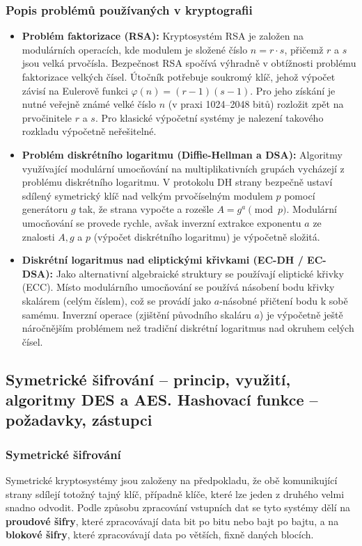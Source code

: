                 \subsubsection{Popis problémů používaných v kryptografii}
                    \begin{itemize}
                        \item \textbf{Problém faktorizace (RSA):} Kryptosystém RSA je založen na modulárních operacích, kde modulem je složené číslo $n = r \cdot s$, přičemž $r$ a $s$ jsou velká prvočísla. Bezpečnost RSA spočívá výhradně v obtížnosti problému faktorizace velkých čísel. Útočník potřebuje soukromý klíč, jehož výpočet závisí na Eulerově funkci $\varphi(n) = (r - 1)(s - 1)$. Pro jeho získání je nutné veřejně známé velké číslo $n$ (v praxi 1024--2048 bitů) rozložit zpět na prvočinitele $r$ a $s$. Pro klasické výpočetní systémy je nalezení takového rozkladu výpočetně neřešitelné.
                        
                        \item \textbf{Problém diskrétního logaritmu (Diffie-Hellman a DSA):} Algoritmy využívající modulární umocňování na multiplikativních grupách vycházejí z problému diskrétního logaritmu. V protokolu DH strany bezpečně ustaví sdílený symetrický klíč nad velkým prvočíselným modulem $p$ pomocí generátoru $g$ tak, že strana vypočte a rozešle $A = g^a \pmod{p}$. Modulární umocňování se provede rychle, avšak inverzní extrakce exponentu $a$ ze znalosti $A, g$ a $p$ (výpočet diskrétního logaritmu) je výpočetně složitá.
                        
                        \item \textbf{Diskrétní logaritmus nad eliptickými křivkami (EC-DH / EC-DSA):} Jako alternativní algebraické struktury se používají eliptické křivky (ECC). Místo modulárního umocňování se používá násobení bodu křivky skalárem (celým číslem), což se provádí jako $a$-násobné přičtení bodu k sobě samému. Inverzní operace (zjištění původního skaláru $a$) je výpočetně ještě náročnějším problémem než tradiční diskrétní logaritmus nad okruhem celých čísel.
                    \end{itemize}
            \subsection{Symetrické šifrování – princip, využití, algoritmy DES a AES. Hashovací funkce – požadavky, zástupci }
                \subsubsection{Symetrické šifrování}
                    Symetrické kryptosystémy jsou založeny na předpokladu, že obě komunikující strany sdílejí totožný tajný klíč, případně klíče, které lze jeden z druhého velmi snadno odvodit. Podle způsobu zpracování vstupních dat se tyto systémy dělí na \textbf{proudové šifry}, které zpracovávají data bit po bitu nebo bajt po bajtu, a na \textbf{blokové šifry}, které zpracovávají data po větších, fixně daných blocích. 

